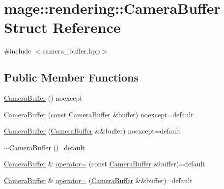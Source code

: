 \hypertarget{structmage_1_1rendering_1_1_camera_buffer}{}\section{mage\+:\+:rendering\+:\+:Camera\+Buffer Struct Reference}
\label{structmage_1_1rendering_1_1_camera_buffer}


{\ttfamily \#include $<$camera\+\_\+buffer.\+hpp$>$}

\subsection*{Public Member Functions}
\begin{DoxyCompactItemize}
\item 
\mbox{\hyperlink{structmage_1_1rendering_1_1_camera_buffer_a751c2923a5deb710d7c3957f04c89fcf}{Camera\+Buffer}} () noexcept
\item 
\mbox{\hyperlink{structmage_1_1rendering_1_1_camera_buffer_a08ff60a4695d723218c5cffb4b95cc59}{Camera\+Buffer}} (const \mbox{\hyperlink{structmage_1_1rendering_1_1_camera_buffer}{Camera\+Buffer}} \&buffer) noexcept=default
\item 
\mbox{\hyperlink{structmage_1_1rendering_1_1_camera_buffer_a16f0d0938bb4e4174461c3a8c8ad3e20}{Camera\+Buffer}} (\mbox{\hyperlink{structmage_1_1rendering_1_1_camera_buffer}{Camera\+Buffer}} \&\&buffer) noexcept=default
\item 
\mbox{\hyperlink{structmage_1_1rendering_1_1_camera_buffer_aadd09f0ddad88a8463e8dda3ae4e3849}{$\sim$\+Camera\+Buffer}} ()=default
\item 
\mbox{\hyperlink{structmage_1_1rendering_1_1_camera_buffer}{Camera\+Buffer}} \& \mbox{\hyperlink{structmage_1_1rendering_1_1_camera_buffer_a5c0b3a1e054ebcb4597f313c0346da57}{operator=}} (const \mbox{\hyperlink{structmage_1_1rendering_1_1_camera_buffer}{Camera\+Buffer}} \&buffer)=default
\item 
\mbox{\hyperlink{structmage_1_1rendering_1_1_camera_buffer}{Camera\+Buffer}} \& \mbox{\hyperlink{structmage_1_1rendering_1_1_camera_buffer_a12658ff989daac2e910b91633ac0223d}{operator=}} (\mbox{\hyperlink{structmage_1_1rendering_1_1_camera_buffer}{Camera\+Buffer}} \&\&buffer)=default
\end{DoxyCompactItemize}
